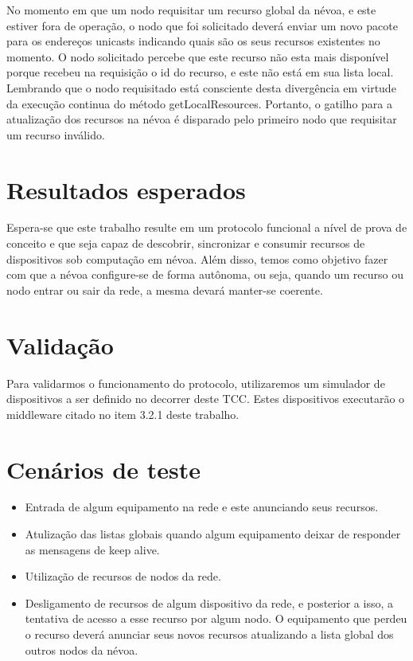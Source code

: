 No momento em que um nodo requisitar um recurso global da névoa, e este estiver fora de operação, o nodo que foi solicitado deverá enviar um novo pacote para os endereços unicasts indicando quais são os seus recursos existentes no momento.
O nodo solicitado percebe que este recurso não esta mais disponível porque recebeu na requisição o id do recurso, e este não está em sua lista local.
Lembrando que o nodo requisitado está consciente desta divergência em virtude da execução continua do método getLocalResources. Portanto, o gatilho para a atualização dos recursos na névoa
é disparado pelo primeiro nodo que requisitar um recurso inválido.


\section{Resultados esperados}

Espera-se que este trabalho resulte em um protocolo funcional a nível de prova de conceito e que seja capaz de descobrir, sincronizar e consumir recursos de dispositivos sob computação em névoa.
Além disso, temos como objetivo fazer com que a névoa configure-se de forma autônoma, ou seja, quando um recurso ou nodo entrar ou sair da rede, a mesma devará manter-se coerente.


\section{Validação}

Para validarmos o funcionamento do protocolo, utilizaremos um simulador de dispositivos a ser definido no decorrer deste TCC.
Estes dispositivos executarão o middleware citado no item 3.2.1 deste trabalho.

\section{Cenários de teste}

\begin{itemize}
    \item Entrada de algum equipamento na rede e este anunciando seus recursos. 
    \item Atulização das listas globais quando algum equipamento deixar de responder as mensagens de keep alive.
    \item Utilização de recursos de nodos da rede.
    \item Desligamento de recursos de algum dispositivo da rede, e posterior a isso, a tentativa de acesso a esse recurso por algum nodo.
    O equipamento que perdeu o recurso deverá anunciar seus novos recursos atualizando a lista global dos outros nodos da névoa.
\end{itemize}








